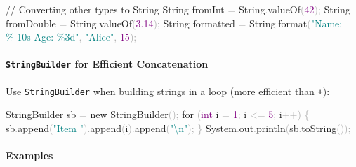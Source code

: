 \documentclass[
  justified,
  openright,
]{tufte-book}
\let\subsubsection\paragraph
\let\paragraph\paragraph
\newcommand{\BuiltInTok}[1]{#1}
\newcommand{\CommentTok}[1]{\textcolor{MidGray}{#1}}
\newcommand{\ControlFlowTok}[1]{\textcolor{BrandBlue}{#1}}
\newcommand{\DataTypeTok}[1]{\textcolor{Purple}{#1}}
\newcommand{\DecValTok}[1]{\textcolor{Purple}{#1}}
\newcommand{\FloatTok}[1]{\textcolor{Purple}{#1}}
\newcommand{\FunctionTok}[1]{\textcolor{BrandBlue}{#1}}
\newcommand{\KeywordTok}[1]{\textcolor{BrandBlue}{#1}}
\newcommand{\NormalTok}[1]{#1}
\newcommand{\OperatorTok}[1]{\textcolor{DarkGray}{#1}}
\newcommand{\SpecialCharTok}[1]{\textcolor{Teal}{#1}}
\newcommand{\StringTok}[1]{\textcolor{Teal}{#1}}
\newenvironment{Shaded}{%
  \begin{snugshade}
}{%
  \end{snugshade}
}
\let\subsubsection\paragraph
\let\paragraph\paragraph
\begin{document}
\begin{Shaded}
\begin{Highlighting}[]
\CommentTok{// Converting other types to String}
\BuiltInTok{String}\NormalTok{ fromInt }\OperatorTok{=} \BuiltInTok{String}\OperatorTok{.}\FunctionTok{valueOf}\OperatorTok{(}\DecValTok{42}\OperatorTok{);}
\BuiltInTok{String}\NormalTok{ fromDouble }\OperatorTok{=} \BuiltInTok{String}\OperatorTok{.}\FunctionTok{valueOf}\OperatorTok{(}\FloatTok{3.14}\OperatorTok{);}
\BuiltInTok{String}\NormalTok{ formatted }\OperatorTok{=} \BuiltInTok{String}\OperatorTok{.}\FunctionTok{format}\OperatorTok{(}\StringTok{"Name: }\SpecialCharTok{\%{-}10s}\StringTok{ Age: }\SpecialCharTok{\%3d}\StringTok{"}\OperatorTok{,} \StringTok{"Alice"}\OperatorTok{,} \DecValTok{15}\OperatorTok{);}
\end{Highlighting}
\end{Shaded}

\subsubsection{\texorpdfstring{\texttt{StringBuilder} for Efficient
Concatenation}{StringBuilder for Efficient Concatenation}}\label{stringbuilder-for-efficient-concatenation}

Use \texttt{StringBuilder} when building strings in a loop (more
efficient than \texttt{+}):

\begin{Shaded}
\begin{Highlighting}[]
\BuiltInTok{StringBuilder}\NormalTok{ sb }\OperatorTok{=} \KeywordTok{new} \BuiltInTok{StringBuilder}\OperatorTok{();}
\ControlFlowTok{for} \OperatorTok{(}\DataTypeTok{int}\NormalTok{ i }\OperatorTok{=} \DecValTok{1}\OperatorTok{;}\NormalTok{ i }\OperatorTok{\textless{}=} \DecValTok{5}\OperatorTok{;}\NormalTok{ i}\OperatorTok{++)} \OperatorTok{\{}
\NormalTok{    sb}\OperatorTok{.}\FunctionTok{append}\OperatorTok{(}\StringTok{"Item "}\OperatorTok{).}\FunctionTok{append}\OperatorTok{(}\NormalTok{i}\OperatorTok{).}\FunctionTok{append}\OperatorTok{(}\StringTok{"}\SpecialCharTok{\textbackslash{}n}\StringTok{"}\OperatorTok{);}
\OperatorTok{\}}
\BuiltInTok{System}\OperatorTok{.}\FunctionTok{out}\OperatorTok{.}\FunctionTok{println}\OperatorTok{(}\NormalTok{sb}\OperatorTok{.}\FunctionTok{toString}\OperatorTok{());}
\end{Highlighting}
\end{Shaded}

\subsubsection{Examples}\label{examples-5}
\end{document}
